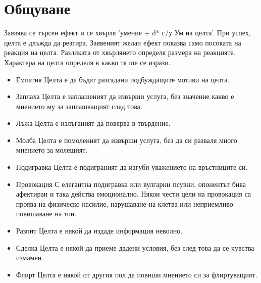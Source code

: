 \section{Общуване}
Заявява се търсен ефект и се хвърля 'умение + d* с/у Ум на целта'.
При успех, целта е длъжда да реагира.
Заявеният желан ефект показва само посоката на реакция на целта.
Разликата от хвърлянето определя размера на реакцията.
Характера на целта определя в какво тя ще се изрази.
\begin{itemize}
\item{Емпатия
Целта е да бъдат разгадани подбуждащите мотиви на целта.}

\item{Заплаха
Целта е заплашеният да извърши услуга, без значение какво е мнението му за заплашващият след това.}

\item{Лъжа
Целта е излъганият да повярва в твърдение.}

\item{Молба
Целта е помоленият да извърши услуга, без да си разваля много мнението за молещият.}

\item{Подигравка
Целта е подиграният да изгуби уважението на връстниците си.}

\item{Провокация
С елегантна подигравка или вулгарни псувни, опонентът бива афектиран и така действа емоционално.
Някои чести цели на провокация са проява на физическо насилие, нарушаване на клетва или неприемливо повишаване на тон.}

\item{Разпит
Целта е някой да издаде информация неволно.}

\item{Сделка
Целта е някой да приеме дадени условия, без след това да се чувства измамен.}

\item{Флирт
Целта е някой от другия пол да повиши мнението си за флиртуващият.}

\end{itemize}

